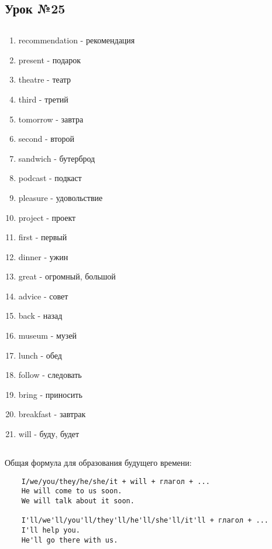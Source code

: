 \subsection{Урок №25}

\subsection*{}
\begin{multicols}{2}
    \begin{enumerate}\setlength{\itemsep}{0pt}
        \item recommendation - рекомендация
        \item present - подарок
        \item theatre - театр
        \item third - третий
        \item tomorrow - завтра
        \item second - второй
        \item sandwich - бутерброд
        \item podcast - подкаст
        \item pleasure - удовольствие
        \item project - проект
        \item first - первый
        \item dinner - ужин
        \item great - огромный, большой
        \item advice - совет
        \item back - назад
        \item museum - музей
        \item lunch - обед
        \item follow - следовать
        \item bring - приносить
        \item breakfast - завтрак
        \item will - буду, будет
    \end{enumerate}
\end{multicols}

\subsection*{}
Общая формула для образования будущего времени:
\begin{verbatim}
    I/we/you/they/he/she/it + will + глагол + ...
    He will come to us soon.
    We will talk about it soon.
    
    I'll/we'll/you'll/they'll/he'll/she'll/it'll + глагол + ...
    I'll help you.
    He'll go there with us.
\end{verbatim}

